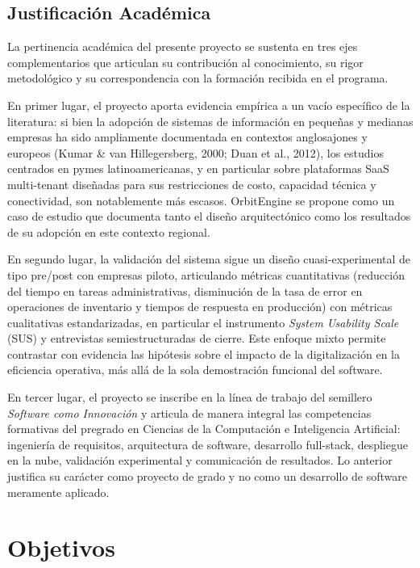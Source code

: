 \subsection{Justificación Académica}\label{justificaciuxf3n-acaduxe9mica}

La pertinencia académica del presente proyecto se sustenta en tres ejes complementarios que articulan su contribución al conocimiento, su rigor metodológico y su correspondencia con la formación recibida en el programa.

En primer lugar, el proyecto aporta evidencia empírica a un vacío específico de la literatura: si bien la adopción de sistemas de información en pequeñas y medianas empresas ha sido ampliamente documentada en contextos anglosajones y europeos (Kumar \& van Hillegersberg, 2000; Duan et al., 2012), los estudios centrados en pymes latinoamericanas, y en particular sobre plataformas SaaS multi-tenant diseñadas para sus restricciones de costo, capacidad técnica y conectividad, son notablemente más escasos. OrbitEngine se propone como un caso de estudio que documenta tanto el diseño arquitectónico como los resultados de su adopción en este contexto regional.

En segundo lugar, la validación del sistema sigue un diseño cuasi-experimental de tipo pre/post con empresas piloto, articulando métricas cuantitativas (reducción del tiempo en tareas administrativas, disminución de la tasa de error en operaciones de inventario y tiempos de respuesta en producción) con métricas cualitativas estandarizadas, en particular el instrumento \emph{System Usability Scale} (SUS) y entrevistas semiestructuradas de cierre. Este enfoque mixto permite contrastar con evidencia las hipótesis sobre el impacto de la digitalización en la eficiencia operativa, más allá de la sola demostración funcional del software.

En tercer lugar, el proyecto se inscribe en la línea de trabajo del semillero \emph{Software como Innovación} y articula de manera integral las competencias formativas del pregrado en Ciencias de la Computación e Inteligencia Artificial: ingeniería de requisitos, arquitectura de software, desarrollo full-stack, despliegue en la nube, validación experimental y comunicación de resultados. Lo anterior justifica su carácter como proyecto de grado y no como un desarrollo de software meramente aplicado.

\section{Objetivos}\label{objetivos}

